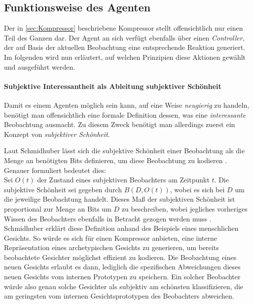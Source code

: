 


\subsection{Funktionsweise des Agenten}
Der in \ref{sec:Kompressor} beschriebene Kompressor stellt offensichtlich nur einen Teil des Ganzen dar. Der Agent an sich verfügt ebenfalls über einen \emph{Controller}, der auf Basis der aktuellen Beobachtung eine entsprechende Reaktion generiert.
Im folgenden wird nun erläutert, auf welchen Prinzipien diese Aktionen gewählt und ausgeführt werden.

\paragraph{Subjektive Interessantheit als Ableitung subjektiver Schönheit}
\label{sec:Beauty_und_Curiosity}

Damit es einem Agenten möglich sein kann, auf eine Weise \emph{neugierig} zu handeln, benötigt man offensichtlich eine formale Definition dessen, was eine \emph{interessante} Beobachtung ausmacht. Zu diesem Zweck benötigt man allerdings zuerst ein Konzept von \emph{subjektiver Schönheit}.

Laut Schmidhuber lässt sich die subjektive Schönheit einer Beobachtung als die Menge an benötigten Bits definieren, um diese Beobachtung zu kodieren \cite[p.~7]{curiosity_schmidhuber}.
Genauer formuliert bedeutet dies: \\
Sei \(O(t)\) der Zustand eines subjektiven Beobachters am Zeitpunkt \(t\). 
Die subjektive Schönheit sei gegeben durch \(B(D,O(t))\), wobei es sich bei \(D\) um die jeweilige Beobachtung handelt.
Dieses Maß der subjektiven Schönheit ist proportional zur Menge an Bits um \(D\) zu beschreiben, wobei jegliches vorheriges Wissen des Beobachters ebenfalls in Betracht gezogen werden muss \cite[p.~7]{curiosity_schmidhuber}.
Schmidhuber erklärt diese Definition anhand des Beispiels eines menschlichen Gesichts. So würde es sich für einen Kompressor anbieten, eine interne Repräsentation eines archetypischen Gesichts zu generieren, um bereits beobachtete Gesichter möglichst effizient zu kodieren. Die Beobachtung eines neuen Gesichts erlaubt es dann, lediglich die spezifischen Abweichungen dieses neuen Gesichts vom internen Prototypen zu speichern. Ein solcher Beobachter würde also genau solche Gesichter als subjektiv am schönsten klassifizieren, die am geringsten vom internen Gesichtsprototypen des Beobachters abweichen. \cite[p.~7]{curiosity_schmidhuber} \\


